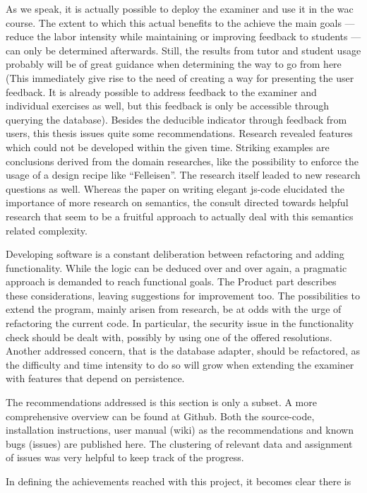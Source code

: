 As we speak, it is actually possible to deploy the \gls{examiner} and use it in 
the \gls{wac} course. The extent to which this actual benefits to the achieve 
the main goals
--- reduce the labor intensity while maintaining or improving feedback to 
students --- can only be determined afterwards. Still, the results from 
\gls{tutor} and \gls{student} usage probably will be of great guidance when 
determining the way to go from here (This immediately give rise to the need of
creating a way for presenting the user feedback. It is already possible to
address feedback to the \gls{examiner} and individual \glspl{exercise} as well,
but this feedback is only be accessible through querying the database).
Besides the deducible indicator through feedback from users, this 
thesis issues quite some recommendations. Research revealed
features which could not be developed within the given time. Striking
examples are conclusions derived from the domain researches, like the possibility
to enforce the usage of a design recipe like ``Felleisen''. The research itself
leaded to new research questions as well. Whereas the paper on writing elegant
\gls{js-code} elucidated the importance of more research on semantics, the
consult directed towards helpful research that seem to be a fruitful approach
to actually deal with this semantics related complexity.


Developing software is a constant deliberation between refactoring and adding
functionality. While the logic can be deduced over and over again, a pragmatic
approach is demanded to reach functional goals. The Product part describes these
considerations, leaving suggestions for improvement too. The possibilities to
extend the program, mainly arisen from research, be at odds with the urge of
refactoring the current code. In particular, the security issue in the 
functionality check should be dealt with, possibly by using one of the offered
resolutions. Another addressed concern, that is the database adapter, should be
refactored, as the difficulty and time intensity to do so will grow when extending
the \gls{examiner} with features that depend on persistence.


The recommendations addressed is this section is only a subset. A more 
comprehensive overview can be found at Github. Both the \gls{source-code}, 
installation instructions, user manual (wiki) as the recommendations and known 
bugs (issues) are published here. The clustering of relevant data and assignment
of issues was very helpful to keep track of the progress.


In defining the achievements reached with this project, it becomes clear there
is






